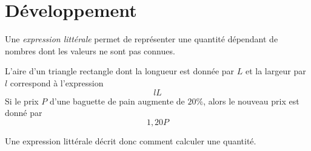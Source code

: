 \documentclass{article}
\begin{document}
\section{Développement}
\begin{tcolorbox}
\begin{definition}
Une \emph{expression littérale} permet de représenter une quantité dépendant de nombres dont les valeurs ne sont pas connues.
\end{definition}
\end{tcolorbox}
\begin{example}
L'aire d'un triangle rectangle dont la longueur est donnée par $L$ et la largeur par $l$ correspond à l'expression
\begin{equation*}
lL
\end{equation*}
Si le prix $P$ d'une baguette de pain augmente de $20 \%$, alors le nouveau prix est donné par
\begin{equation*}
1,20P
\end{equation*}
\end{example}
Une expression littérale décrit donc comment calculer une quantité.
\end{document}
